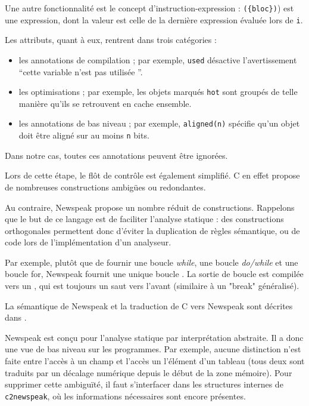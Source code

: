 Une autre fonctionnalité est le concept d'instruction-expression :
\texttt{(\{bloc\})}) est une expression, dont la valeur est celle de la dernière
expression évaluée lors de \texttt{i}.

Les attributs, quant à eux, rentrent dans trois catégories :

\begin{itemize}
  \item les annotations de compilation ; par exemple, \texttt{used} désactive
    l'avertissement ``cette variable n'est pas utilisée ''.

  \item les optimisations ; par exemple, les objets marqués \texttt{hot} sont
    groupés de telle manière qu'ils se retrouvent en cache ensemble.

  \item les annotations de bas niveau ; par exemple, \texttt{aligned(n)}
    spécifie qu'un objet doit être aligné sur au moins \texttt{n} bits.
\end{itemize}

Dans notre cas, toutes ces annotations peuvent être ignorées.


Lors de cette étape, le flôt de contrôle est également simplifié. C en effet
propose de nombreuses constructions ambigües ou redondantes.

Au contraire, Newspeak propose un nombre réduit de constructions. Rappelons que
le but de ce langage est de faciliter l'analyse statique : des constructions
orthogonales permettent donc d'éviter la duplication de règles sémantique, ou de
code lors de l'implémentation d'un analyseur.

Par exemple, plutôt que de fournir une boucle \emph{while}, une boucle
\emph{do/while} et une boucle for, Newspeak fournit une unique boucle
\npkWhile{}. La sortie de boucle est compilée vers un \npkGoto{}\cite{goto}, qui est
toujours un saut vers l'avant (similaire à un "break" généralisé).

La sémantique de Newspeak et la traduction de C vers Newspeak sont décrites dans
\cite{newspeak}.

Newspeak est conçu pour l'analyse statique par interprétation abstraite. Il a
donc une vue de bas niveau sur les programmes. Par exemple, aucune distinction
n'est faite entre l'accès à un champ et l'accès un l'élément d'un tableau (tous
deux sont traduits par un décalage numérique depuis le début de la zone
mémoire). Pour supprimer cette ambiguïté, il faut s'interfacer dans les
structures internes de \texttt{c2newspeak}, où les informations nécessaires sont
encore présentes.

